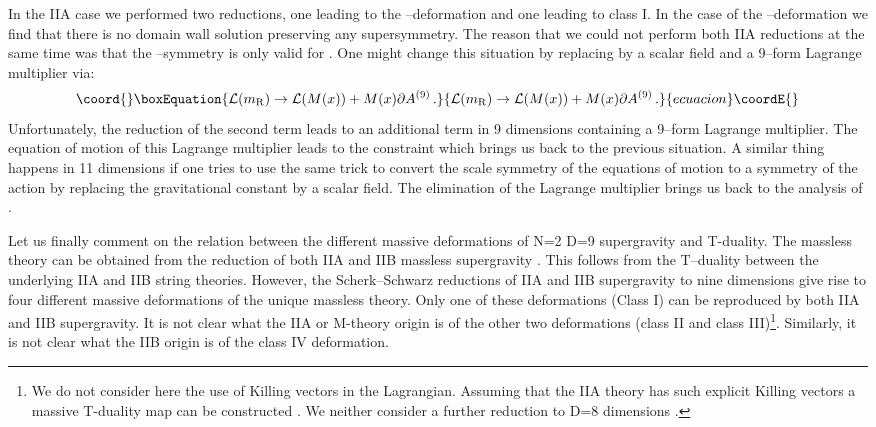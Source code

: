 \documentclass[12pt,a4paper]{article}
\begin{document}
In the IIA case we performed two reductions, one leading to the
\coordHE{}--deformation and one leading to class I. In the case of the
\coordHE{}--deformation we find that there is no domain wall solution
preserving any supersymmetry.
The reason that we could not
perform both IIA reductions at the same time was that the \coordHE{}--symmetry
is only valid for \coordHE{}. One might change this situation
by replacing \coordHE{} by a scalar field \coordHE{} and a 9--form
Lagrange multiplier \coordHE{} \cite{Bergshoeff:2001pv} via:
\begin{equation}\coord{}\boxEquation{
  \mathcal{L}(m_{\rm R}) \rightarrow \mathcal{L}(M(x)) + M(x)\partial A^{(9)}\, .
}{
  \mathcal{L}(m_{\rm R}) \rightarrow \mathcal{L}(M(x)) + M(x)\partial A^{(9)}\, .
}{ecuacion}\coordE{}\end{equation}
Unfortunately, the reduction of the second term leads to an
additional term in 9 dimensions containing a 9--form Lagrange multiplier.
The equation of motion of this Lagrange multiplier leads to the
constraint \coordHE{} which brings us back to the previous situation.
A similar thing happens in 11 dimensions if one tries to use
the same trick to convert the scale symmetry of the
equations of motion to a symmetry of the action by replacing the
gravitational constant by a scalar field. The elimination of the
Lagrange multiplier brings us back to the analysis of \cite{Howe:1998qt}.


Let us finally comment on the relation between the
different massive deformations of N=2 D=9
supergravity and T-duality. The massless theory can be obtained
from the reduction of both IIA and IIB massless supergravity
\cite{Bergshoeff:1995as}. This follows from the T--duality between the
underlying IIA and IIB string theories. However, the Scherk--Schwarz
reductions
of IIA and IIB supergravity to nine dimensions give rise to four different
massive
deformations of the unique massless theory.
Only one of these deformations (Class I)
can be reproduced by both IIA and IIB supergravity.
It is not clear what the IIA or M-theory origin is of the other
two deformations (class II and class III)\footnote{We do not consider here
the use of Killing vectors in the Lagrangian. Assuming that the IIA theory
has such explicit Killing vectors a massive T-duality map can be constructed
\cite{Meessen:1998qm}. We neither consider a further reduction to
D=8 dimensions \cite{Hull:1998vy}.}. Similarly, it is not clear what the
IIB origin is of the class IV deformation.
\end{document}
